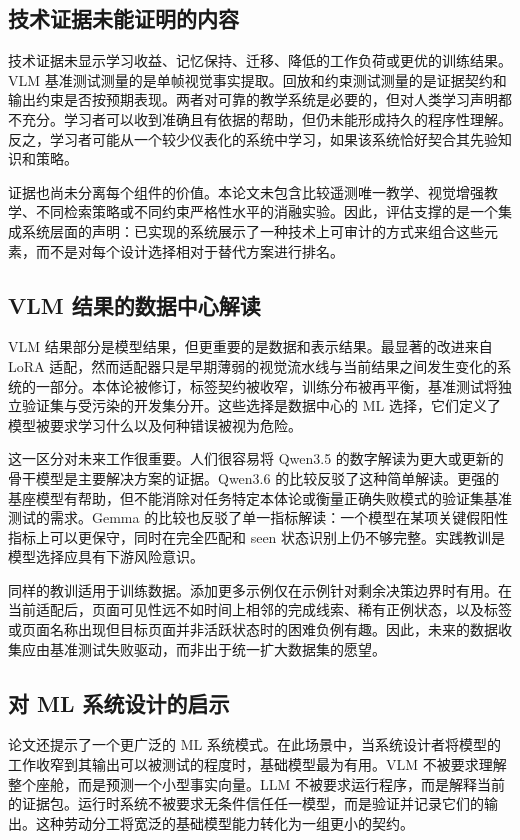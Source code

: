 \subsection{技术证据未能证明的内容}

技术证据未显示学习收益、记忆保持、迁移、降低的工作负荷或更优的训练结果。VLM 基准测试测量的是单帧视觉事实提取。回放和约束测试测量的是证据契约和输出约束是否按预期表现。两者对可靠的教学系统是必要的，但对人类学习声明都不充分。学习者可以收到准确且有依据的帮助，但仍未能形成持久的程序性理解。反之，学习者可能从一个较少仪表化的系统中学习，如果该系统恰好契合其先验知识和策略。

证据也尚未分离每个组件的价值。本论文未包含比较遥测唯一教学、视觉增强教学、不同检索策略或不同约束严格性水平的消融实验。因此，评估支撑的是一个集成系统层面的声明：已实现的系统展示了一种技术上可审计的方式来组合这些元素，而不是对每个设计选择相对于替代方案进行排名。

\subsection{VLM 结果的数据中心解读}

VLM 结果部分是模型结果，但更重要的是数据和表示结果。最显著的改进来自 LoRA 适配，然而适配器只是早期薄弱的视觉流水线与当前结果之间发生变化的系统的一部分。本体论被修订，标签契约被收窄，训练分布被再平衡，基准测试将独立验证集与受污染的开发集分开。这些选择是数据中心的 ML 选择，它们定义了模型被要求学习什么以及何种错误被视为危险。

这一区分对未来工作很重要。人们很容易将 Qwen3.5 的数字解读为更大或更新的骨干模型是主要解决方案的证据。Qwen3.6 的比较反驳了这种简单解读。更强的基座模型有帮助，但不能消除对任务特定本体论或衡量正确失败模式的验证集基准测试的需求。Gemma 的比较也反驳了单一指标解读：一个模型在某项关键假阳性指标上可以更保守，同时在完全匹配和 seen 状态识别上仍不够完整。实践教训是模型选择应具有下游风险意识。

同样的教训适用于训练数据。添加更多示例仅在示例针对剩余决策边界时有用。在当前适配后，页面可见性远不如时间上相邻的完成线索、稀有正例状态，以及标签或页面名称出现但目标页面并非活跃状态时的困难负例有趣。因此，未来的数据收集应由基准测试失败驱动，而非出于统一扩大数据集的愿望。

\subsection{对 ML 系统设计的启示}

论文还提示了一个更广泛的 ML 系统模式。在此场景中，当系统设计者将模型的工作收窄到其输出可以被测试的程度时，基础模型最为有用。VLM 不被要求理解整个座舱，而是预测一个小型事实向量。LLM 不被要求运行程序，而是解释当前的证据包。运行时系统不被要求无条件信任任一模型，而是验证并记录它们的输出。这种劳动分工将宽泛的基础模型能力转化为一组更小的契约。

